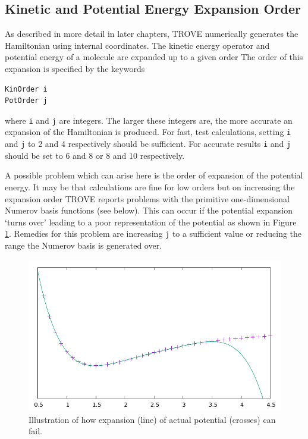 \subsection{Kinetic and Potential Energy Expansion Order}
As described in more detail in later chapters, TROVE numerically generates the Hamiltonian using internal coordinates. 
The kinetic energy operator and potential energy of a molecule are expanded up to a given order 
The order of this expansion is specified by the keywords
\begin{verbatim}
KinOrder i
PotOrder j
\end{verbatim}
where \verb|i| and \verb|j| are integers. The larger these integers are, the more accurate an expansion 
of the Hamiltonian is produced. 
For fast, test calculations, setting \verb|i| and \verb|j| to 2 and 4 respectively should be sufficient. 
For accurate results \verb|i| and \verb|j| should be set to 6 and 8 or 8 and 10 respectively.\cite{TROVE} 

A possible problem which can arise here is the order of expansion of the potential energy. 
It may be that calculations are fine for low orders but on increasing the expansion order TROVE reports problems 
with the primitive one-dimensional Numerov basis functions (see below). 
This can occur if the potential expansion `turns over' leading to a poor representation of the potential as shown
in Figure \ref{fig:pot_exp}.
Remedies for this problem are increasing \verb|j| to a sufficient value or reducing the range the Numerov basis is 
generated over. 

\begin{figure}[h!]
	\centering
	\includegraphics[scale=0.8]{pot_expand} 
	\caption{Illustration of how expansion (line) of actual potential (crosses) can fail.}
	\label{fig:pot_exp}
\end{figure}

